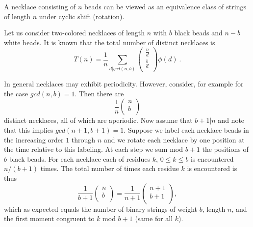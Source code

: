 \documentclass[10pt,conference]{IEEEtran}
\begin{document}
A necklace consisting of $n$ beads can be viewed as an equivalence
class of strings of length $n$ under cyclic shift (rotation).

Let us consider two-colored necklaces of length $n$ with $b$ black
beads and $n-b$ white beads. It is known that the total number of
distinct necklaces is
\begin{equation}
T(n)=\frac{1}{n} \sum_{d|gcd(n,b)} \left( \begin{array}{c}
                             \frac{n}{d} \\
                             \frac{b}{d} \\
                           \end{array} \right)\phi(d)~.
\end{equation}

In general necklaces may exhibit periodicity.
However, consider, for example for the case $gcd(n,b)=1$.
Then there are
\begin{equation*}
\frac{1}{n} \left( \begin{array}{c}
                             n \\
                             b \\
                           \end{array} \right)
\end{equation*}
distinct necklaces, all of which are aperiodic.
Now assume that $b+1|n$ and note that
this implies $gcd(n+1,b+1) =1$.
Suppose we label
each necklace beads in the increasing order $1$ through $n$ and we
rotate each necklace by one position at the time relative to this
labeling. At each step we sum mod $b+1$ the positions of $b$ black
beads. For each necklace each of residues $k$, $0 \leq k \leq b$ is
encountered $n/(b+1)$ times. The total number of times each residue
$k$ is encountered is thus
\begin{equation*}
\frac{1}{b+1} \left( \begin{array}{c}
                             n \\
                             b \\
                           \end{array} \right)=\frac{1}{n+1} \left( \begin{array}{c}
                             n+1 \\
                             b+1 \\
                           \end{array} \right),
\end{equation*}
which as expected equals the number of binary strings of weight $b$,
length $n$, and the first moment congruent to $k$ mod $b+1$ (same
for all $k$).
\end{document}
